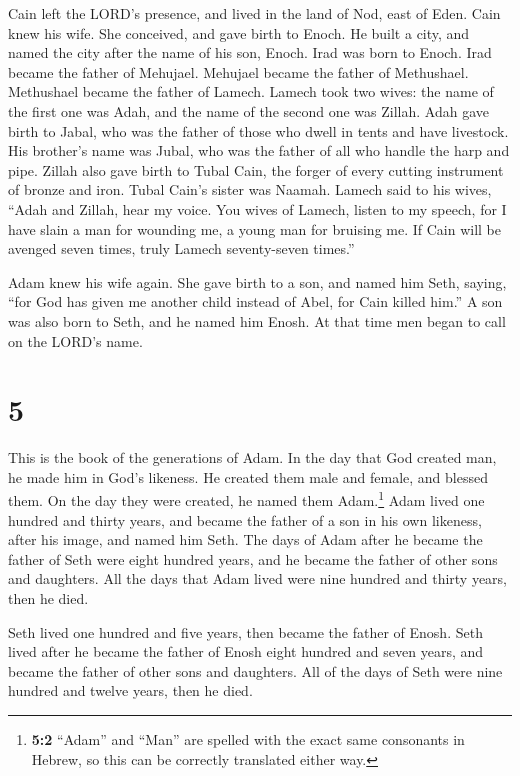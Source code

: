 Cain left the LORD's presence, and lived in the land of
Nod, east of Eden.  Cain knew his wife. She conceived,
and gave birth to Enoch. He built a city, and named the city after the
name of his son, Enoch.  Irad was born to Enoch. Irad
became the father of Mehujael. Mehujael became the father of Methushael.
Methushael became the father of Lamech.  Lamech took two
wives: the name of the first one was Adah, and the name of the second
one was Zillah.  Adah gave birth to Jabal, who was the
father of those who dwell in tents and have livestock. 
His brother's name was Jubal, who was the father of all who handle the
harp and pipe.  Zillah also gave birth to Tubal Cain, the
forger of every cutting instrument of bronze and iron. Tubal Cain's
sister was Naamah.  Lamech said to his wives, ``Adah and
Zillah, hear my voice. You wives of Lamech, listen to my speech, for I
have slain a man for wounding me, a young man for bruising me.
 If Cain will be avenged seven times, truly Lamech
seventy-seven times.''

 Adam knew his wife again. She gave birth to a son, and
named him Seth, saying, ``for God has given me another child instead of
Abel, for Cain killed him.''  A son was also born to
Seth, and he named him Enosh. At that time men began to call on the
LORD's name.

\hypertarget{section-4}{%
\section{5}\label{section-4}}

 This is the book of the generations of Adam. In the day
that God created man, he made him in God's likeness.  He
created them male and female, and blessed them. On the day they were
created, he named them Adam.\footnote{\textbf{5:2} ``Adam'' and ``Man''
  are spelled with the exact same consonants in Hebrew, so this can be
  correctly translated either way.}  Adam lived one
hundred and thirty years, and became the father of a son in his own
likeness, after his image, and named him Seth.  The days
of Adam after he became the father of Seth were eight hundred years, and
he became the father of other sons and daughters.  All the
days that Adam lived were nine hundred and thirty years, then he died.

 Seth lived one hundred and five years, then became the
father of Enosh.  Seth lived after he became the father of
Enosh eight hundred and seven years, and became the father of other sons
and daughters.  All of the days of Seth were nine hundred
and twelve years, then he died.

